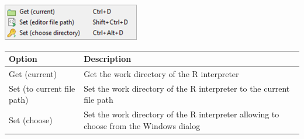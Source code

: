 \includegraphics[scale=0.50]{./res/menu_r_control_workdir.png}\\

\begin{scriptsize}
  \begin{tabularx}{\headwidth}{>{\hsize=0.2\hsize}X>{\hsize=0.7\hsize}X}\\
    \hline
    \textbf{Option} & \textbf{Description} \\
    \hline
    Get (current) & Get the work directory of the R interpreter \\
    Set (to current file path) & Set the work directory of the R interpreter to the current file path \\
    Set (choose) & Set the work directory of the R interpreter allowing to choose from the Windows dialog \\
    \hline
  \end{tabularx}
\end{scriptsize}


